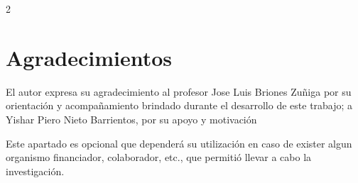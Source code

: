 \documentclass[12pt,twoside,titlepage]{ingenius}
\begin{document}
\begin{multicols}{2}
\section*{Agradecimientos}

El autor expresa su agradecimiento al profesor Jose Luis Briones Zuñiga por su orientación y acompañamiento brindado durante el desarrollo de este trabajo; a Yishar Piero Nieto Barrientos, por su apoyo y motivación 

Este apartado es opcional que dependerá su utilización en caso de exister algun organismo financiador, colaborador, etc., que permitió llevar a cabo la investigación.




\end{multicols}
\end{document}
